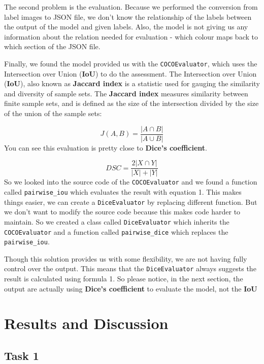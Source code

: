 \documentclass[conference]{IEEEtran}
\begin{document}
The second problem is the evaluation. Because we performed the conversion from label images to JSON file, we don't know the relationship of the labels between the output of the model and given labels. Also, the model is not giving us any information about the relation needed for evaluation - which colour maps back to which section of the JSON file. 

Finally, we found the model provided us with the \verb|COCOEvaluator|, which uses the Intersection over Union (\textbf{IoU}) to do the assessment. The Intersection over Union (\textbf{IoU}), also known as \textbf{Jaccard index} is a statistic used for gauging the similarity and diversity of sample sets. The \textbf{Jaccard index} measures similarity between finite sample sets, and is defined as the size of the intersection divided by the size of the union of the sample sets:

\begin{equation}
    J(A,B)=\frac{|A\cap B|}{|A\cup B|}
    \label{eq:IoU}
\end{equation}
You can see this evaluation is pretty close to \textbf{Dice's coefficient}. 

\begin{equation}
	DSC = \frac{2|X \cap Y|}{|X| + |Y|}
	\label{eq:Dice}
\end{equation}
So we looked into the source code of the \verb|COCOEvaluator| and we found a function called \verb|pairwise_iou| which evaluates the result with equation 1. This makes things easier, we can create a \verb|DiceEvaluator| by replacing different function. But we don't want to modify the source code because this makes code harder to maintain. So we created a class called \verb|DiceEvaluator| which inherits the \verb|COCOEvaluator| and a function called \verb|pairwise_dice| which replaces the \verb|pairwise_iou|. 

Though this solution provides us with some flexibility, we are not having fully control over the output. This means that the \verb|DiceEvaluator| always suggests the result is calculated using formula 1. So please notice, in the next section, the output are actually using \textbf{Dice's coefficient} to evaluate the model, not the \textbf{IoU} 


\section{Results and Discussion}

\subsection{Task 1}
\end{document}
